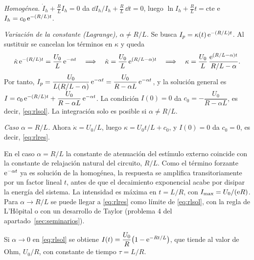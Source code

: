 \documentclass[11pt,twoside]{article}
\begin{document}
\begin{demostracion}
\emph{Homogénea.} $\dot I_h+\frac RL I_h=0$ da $\dd I_h/I_h+\frac RL\,\dd t=0$, luego $\ln I_h+\frac RL t=\text{cte}$ e
$I_h=c_0\,\mathrm{e}^{-(R/L)t}$.

\emph{Variación de la constante (Lagrange), $\alpha\neq R/L$.} Se busca $I_p=\kappa(t)\,\mathrm{e}^{-(R/L)t}$. Al sustituir se cancelan
los términos en $\kappa$ y queda
\begin{equation*}
\dot\kappa\,\mathrm{e}^{-(R/L)t}=\frac{U_0}{L}\,\mathrm{e}^{-\alpha t}\quad\Longrightarrow\quad\dot\kappa=\frac{U_0}{L}\,\mathrm{e}^{(R/L-\alpha)t}
\quad\Longrightarrow\quad\kappa=\frac{U_0}{L}\,\frac{\mathrm{e}^{(R/L-\alpha)t}}{R/L-\alpha}.
\end{equation*}
Por tanto, $I_p=\dfrac{U_0}{L(R/L-\alpha)}\,\mathrm{e}^{-\alpha t}=\dfrac{U_0}{R-\alpha L}\,\mathrm{e}^{-\alpha t}$, y la solución general es
$I=c_0\,\mathrm{e}^{-(R/L)t}+\dfrac{U_0}{R-\alpha L}\,\mathrm{e}^{-\alpha t}$. La condición $I(0)=0$ da $c_0=-\dfrac{U_0}{R-\alpha L}$, es
decir, \eqref{eq:rlsol}. La integración solo es posible si $\alpha\neq R/L$.

\emph{Caso $\alpha=R/L$.} Ahora $\dot\kappa=U_0/L$, luego $\kappa=U_0t/L+c_0$, y $I(0)=0$ da $c_0=0$, es decir, \eqref{eq:rlres}.
\end{demostracion}

\begin{observacion}[resonancia]
En el caso $\alpha=R/L$ la constante de atenuación del estímulo externo coincide con la constante de relajación natural del
circuito, $R/L$. Como el término forzante $\mathrm{e}^{-\alpha t}$ ya es solución de la homogénea, la respuesta se amplifica
transitoriamente por un factor lineal $t$, antes de que el decaimiento exponencial acabe por disipar la energía del sistema.
La intensidad es máxima en $t=L/R$, con $I_{\max}=U_0/(\mathrm{e} R)$. Para $\alpha\to R/L$ se puede llegar a \eqref{eq:rlres} como
límite de \eqref{eq:rlsol}, con la regla de L'Hôpital o con un desarrollo de Taylor (problema 4 del apartado~\ref{sec:seminarios}).
\end{observacion}

\begin{observacion}
Si $\alpha\to0$ en \eqref{eq:rlsol} se obtiene $I(t)=\dfrac{U_0}{R}\big(1-\mathrm{e}^{-Rt/L}\big)$, que tiende al valor de Ohm,
$U_0/R$, con constante de tiempo $\tau=L/R$.
\end{observacion}
\end{document}
